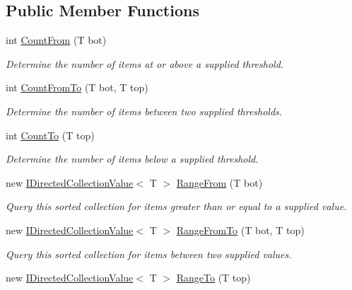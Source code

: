 \subsection*{Public Member Functions}
\begin{DoxyCompactItemize}
\item 
int \hyperlink{interface_c5_1_1_i_indexed_sorted_afec472803ce8298d60dfc5dfb2f8f925}{Count\+From} (T bot)
\begin{DoxyCompactList}\small\item\em Determine the number of items at or above a supplied threshold. \end{DoxyCompactList}\item 
int \hyperlink{interface_c5_1_1_i_indexed_sorted_a6b8dd3c5325621b9a81a7e5167328773}{Count\+From\+To} (T bot, T top)
\begin{DoxyCompactList}\small\item\em Determine the number of items between two supplied thresholds. \end{DoxyCompactList}\item 
int \hyperlink{interface_c5_1_1_i_indexed_sorted_ae69946df07200b99fa1336681223680a}{Count\+To} (T top)
\begin{DoxyCompactList}\small\item\em Determine the number of items below a supplied threshold. \end{DoxyCompactList}\item 
new \hyperlink{interface_c5_1_1_i_directed_collection_value}{I\+Directed\+Collection\+Value}$<$ T $>$ \hyperlink{interface_c5_1_1_i_indexed_sorted_a798fe33ccf02cdb90e7966bf73d100eb}{Range\+From} (T bot)
\begin{DoxyCompactList}\small\item\em Query this sorted collection for items greater than or equal to a supplied value. \end{DoxyCompactList}\item 
new \hyperlink{interface_c5_1_1_i_directed_collection_value}{I\+Directed\+Collection\+Value}$<$ T $>$ \hyperlink{interface_c5_1_1_i_indexed_sorted_a7fd04b75c6f1e86867f8a27309067a5d}{Range\+From\+To} (T bot, T top)
\begin{DoxyCompactList}\small\item\em Query this sorted collection for items between two supplied values. \end{DoxyCompactList}\item 
new \hyperlink{interface_c5_1_1_i_directed_collection_value}{I\+Directed\+Collection\+Value}$<$ T $>$ \hyperlink{interface_c5_1_1_i_indexed_sorted_a62820d898864d45d9029d9df06ab3c5d}{Range\+To} (T top)

\end{DoxyCompactItemize}
